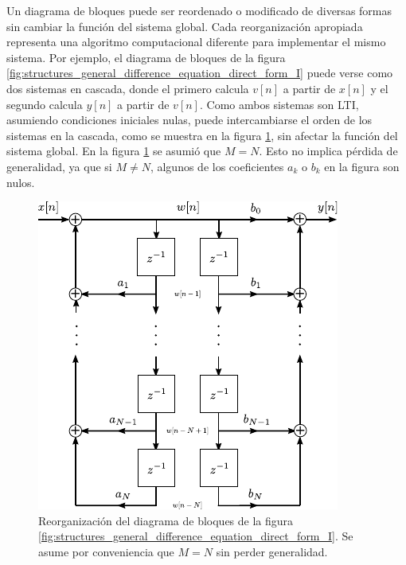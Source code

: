 \documentclass[a4paper]{report}
\begin{document}
Un diagrama de bloques puede ser reordenado o modificado de diversas formas sin cambiar la función del sistema global. Cada reorganización apropiada representa una algoritmo computacional diferente para implementar el mismo sistema. Por ejemplo, el diagrama de bloques de la figura \ref{fig:structures_general_difference_equation_direct_form_I} puede verse como dos sistemas en cascada, donde el primero calcula \(v[n]\) a partir de \(x[n]\) y el segundo calcula \(y[n]\) a partir de \(v[n]\). Como ambos sistemas son LTI, asumiendo condiciones iniciales nulas, puede intercambiarse el orden de los sistemas en la cascada, como se muestra en la figura \ref{fig:structures_general_difference_equation_direct_form_II}, sin afectar la función del sistema global. En la figura \ref{fig:structures_general_difference_equation_direct_form_II} se asumió que \(M=N\). Esto no implica pérdida de generalidad, ya que si \(M\neq N\), algunos de los coeficientes \(a_k\) o \(b_k\) en la figura son nulos.
\begin{figure}[!htb]
  \begin{minipage}[c]{0.56\textwidth}
    \includegraphics[width=\textwidth]{figuras/structures_general_difference_equation_direct_form_II.pdf}
  \end{minipage}\hfill
  \begin{minipage}[c]{0.34\textwidth}
    \caption{
     Reorganización del diagrama de bloques de la figura \ref{fig:structures_general_difference_equation_direct_form_I}. Se asume por conveniencia que \(M=N\) sin perder generalidad. 
    }\label{fig:structures_general_difference_equation_direct_form_II}
  \end{minipage}
\end{figure}
\end{document}
